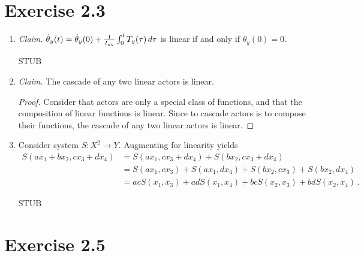 \documentclass{abrice}
\begin{document}
\section{Exercise 2.3}

\begin{enumerate}[label= (\alph*)]
\item \textit{Claim.}
  $\dot{\theta}_y(t) = \dot{\theta}_y(0) + {1 \over I_{yy}} \int_0^t T_y(\tau)\,
  d\tau$ is linear if and only if $\dot{\theta}_y(0) = 0$.

  STUB

\item \textit{Claim.} The cascade of any two linear actors is linear.
  \begin{proof}
    Consider that actors are only a special class of functions, and that the
    composition of linear functions is linear. Since to cascade actors is to
    compose their functions, the cascade of any two linear actors is linear.
  \end{proof}
\item Consider system $S\colon X^2 \rightarrow Y$. Augmenting for linearity
  yields
  \begin{align*}
    S(ax_1 + bx_2, cx_3 + dx_4)
    &= S(ax_1,cx_3 + dx_4) + S(bx_2,cx_3 + dx_4) \\
    &= S(ax_1,cx_3) + S(ax_1,dx_4) + S(bx_2,cx_3) + S(bx_2,dx_4) \\
    &= acS(x_1, x_3) + adS(x_1, x_4) + bcS(x_2, x_3) + bdS(x_2, x_4)\, .
  \end{align*}

  STUB
\end{enumerate}

\section{Exercise 2.5}
\end{document}
